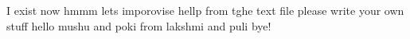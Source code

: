 I exist now hmmm
lets imporovise 
hellp from tghe text file
please write your own stuff
hello mushu and poki from lakshmi and puli
bye!
